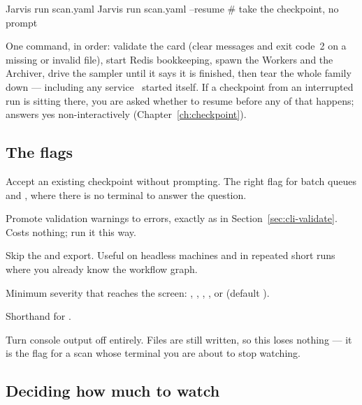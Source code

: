 \begin{terminal}
\begin{jcmd}
Jarvis run scan.yaml
Jarvis run scan.yaml --resume    # take the checkpoint, no prompt
\end{jcmd}
\end{terminal}

One command, in order: validate the card (clear messages and exit code~2 on a missing or
invalid file), start Redis bookkeeping, spawn the Workers and the Archiver, drive the
sampler until it says it is finished, then tear the whole family down --- including any
 service \Jtwo\ started itself. If a checkpoint from an
interrupted run is sitting there, you are asked whether to resume before any of that
happens;  answers yes non-interactively
(Chapter~\ref{ch:checkpoint}).

\subsection{The flags}

\begin{keylist}
  \item[--resume] Accept an existing checkpoint without prompting. The right flag for
        batch queues and , where there is no terminal to answer the question.
  \item[--strict] Promote validation warnings to errors, exactly as in
        Section~\ref{sec:cli-validate}. Costs nothing; run it this way.
  \item[--skip-draw-flowchart] Skip the  and 
        export. Useful on headless machines and in repeated short runs where you already
        know the workflow graph.
  \item[--console-level LEVEL] Minimum severity that reaches the screen: ,
        , , , or  (default
        ).
  \item[--debug, -d] Shorthand for .
  \item[--silence, -s] Turn console output off entirely. Files are still written, so this
        loses nothing --- it is the flag for a scan whose terminal you are about to stop
        watching.
\end{keylist}

\subsection{Deciding how much to watch}
\label{sec:cli-logging-flags}

